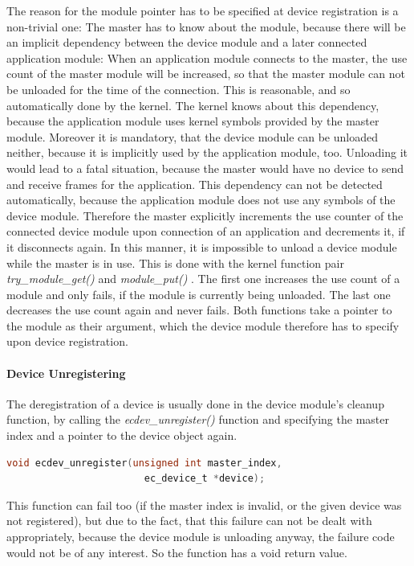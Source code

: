 \documentclass[a4paper,12pt,BCOR6mm,bibtotoc,idxtotoc]{scrbook}
\begin{document}
The reason for the module pointer has to be specified at device registration is
a non-trivial one: The master has to know about the module, because there will
be an implicit dependency between the device module and a later connected
application module: When an application module connects to the master, the use
count of the master module will be increased, so that the master module can not
be unloaded for the time of the connection. This is reasonable, and so
automatically done by the kernel. The kernel knows about this dependency,
because the application module uses kernel symbols provided by the master
module.  Moreover it is mandatory, that the device module can be unloaded
neither, because it is implicitly used by the application module, too.
Unloading it would lead to a fatal situation, because the master would have no
device to send and receive frames for the application. This dependency can not
be detected automatically, because the application module does not use any
symbols of the device module. Therefore the master explicitly increments the
use counter of the connected device module upon connection of an application
and decrements it, if it disconnects again. In this manner, it is impossible to
unload a device module while the master is in use. This is done with the kernel
function pair \textit{try\_module\_get()}
 and \textit{module\_put()}
. The first one increases the use
count of a module and only fails, if the module is currently being unloaded.
The last one decreases the use count again and never fails. Both functions take
a pointer to the module as their argument, which the device module therefore
has to specify upon device registration.

\paragraph{Device Unregistering}

The deregistration of a device is usually done in the device module's cleanup
function, by calling the \textit{ecdev\_unregister()} function and specifying
the master index and a pointer to the device object again.

\begin{lstlisting}[gobble=2,language=C]
  void ecdev_unregister(unsigned int master_index,
                        ec_device_t *device);
\end{lstlisting}

This function can fail too (if the master index is invalid, or the
given device was not registered), but due to the fact, that this
failure can not be dealt with appropriately, because the device module
is unloading anyway, the failure code would not be of any interest. So
the function has a void return value.
\end{document}
